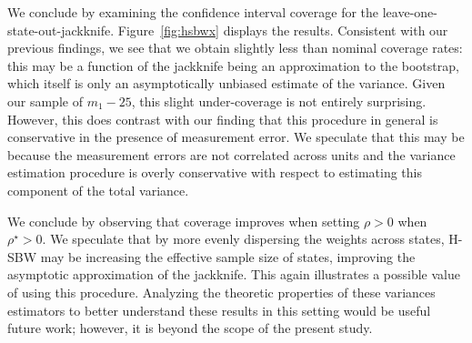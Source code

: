 
We conclude by examining the confidence interval coverage for the leave-one-state-out-jackknife. Figure~\ref{fig:hsbwx} displays the results. Consistent with our previous findings, we see that we obtain slightly less than nominal coverage rates: this may be a function of the jackknife being an approximation to the bootstrap, which itself is only an asymptotically unbiased estimate of the variance. Given our sample of $m_1 - 25$, this slight under-coverage is not entirely surprising. However, this does contrast with our finding that this procedure in general is conservative in the presence of measurement error. We speculate that this may be because the measurement errors are not correlated across units and the variance estimation procedure is overly conservative with respect to estimating this component of the total variance. 

We conclude by observing that coverage improves when setting $\rho > 0$ when $\rho^\star > 0$. We speculate that by more evenly dispersing the weights across states, H-SBW may be increasing the effective sample size of states, improving the asymptotic approximation of the jackknife. This again illustrates a possible value of using this procedure. Analyzing the theoretic properties of these variances estimators to better understand these results in this setting would be useful future work; however, it is beyond the scope of the present study.

